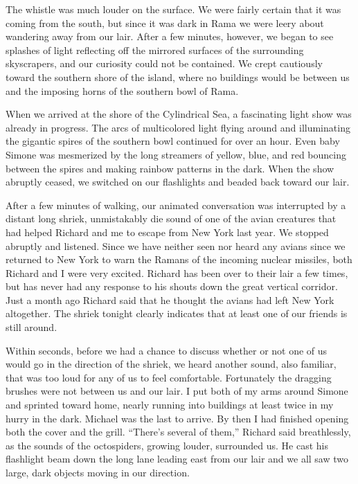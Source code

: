 \documentclass[]{article}
\begin{document}
The whistle was much louder on the surface.  We were fairly certain that it was coming from the south, but since it was dark in Rama we were leery about wandering away from our lair.  After a few minutes, however, we began to see splashes of light reflecting off the mirrored surfaces of the surrounding skyscrapers, and our curiosity could not be contained.  We crept cautiously toward the southern shore of the island, where no buildings would be between us and the imposing horns of the southern bowl of Rama.

When we arrived at the shore of the Cylindrical Sea, a fascinating light show was already in progress.  The arcs of multicolored light flying around and illuminating the gigantic spires of the southern bowl continued for over an hour.  Even baby Simone was mesmerized by the long streamers of yellow, blue, and red bouncing between the spires and making rainbow patterns in the dark.  When the show abruptly ceased, we switched on our flashlights and beaded back toward our lair.

After a few minutes of walking, our animated conversation was interrupted by a distant long shriek, unmistakably die sound of one of the avian creatures that had helped Richard and me to escape from New York last year.  We stopped abruptly and listened.  Since we have neither seen nor heard any avians since we returned to New York to warn the Ramans of the incoming nuclear missiles, both Richard and I were very excited.  Richard has been over to their lair a few times, but has never had any response to his shouts down the great vertical corridor.  Just a month ago Richard said that he thought the avians had left New York altogether.  The shriek tonight clearly indicates that at least one of our friends is still around.

Within seconds, before we had a chance to discuss whether or not one of us would go in the direction of the shriek, we heard another sound, also familiar, that was too loud for any of us to feel comfortable.  Fortunately the dragging brushes were not between us and our lair.  I put both of my arms around Simone and sprinted toward home, nearly running into buildings at least twice in my hurry in the dark.  Michael was the last to arrive.  By then I had finished opening both the cover and the grill.  “There’s several of them,” Richard said breathlessly, as the sounds of the octospiders, growing louder, surrounded us.  He cast his flashlight beam down the long lane leading east from our lair and we all saw two large, dark objects moving in our direction.
\end{document}
